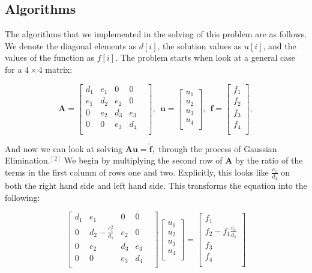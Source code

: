 \documentclass{article}
\begin{document}
\subsection{Algorithms}
The algorithms that we implemented in the solving of this problem are as follows. We denote the diagonal elements as $d[i]$, the solution values as $u[i]$, and the values of the function as $f[i]$. The problem starts when look at a general case for a $4\times 4$ matrix:

\[
\mathbf{A} = \begin{bmatrix}
d_{1}& e_{1}& 0& 0& \\
e_{1}& d_{2}& e_{2}& 0& \\
0& e_{2}& d_{3}& e_{3}& \\
0& 0& e_{3}& d_{4}& \\
\end{bmatrix},
\
\
\mathbf{u} = \begin{bmatrix}
u_{1}\\
u_{2} \\
u_{3}\\
u_{4}\\
\end{bmatrix},
\
\
\mathbf{f} = \begin{bmatrix}
f_{1}\\
f_{2} \\
f_{3}\\
f_{4}\\
\end{bmatrix},
\]

And now we can look at solving $\mathbf{A}\mathbf{u} = \tilde{\mathbf{f}},$ through the process of Gaussian Elimination.$^{[2]}$ We begin by multiplying the second row of $\mathbf{A}$ by the ratio of the terms in the first column of rows one and two. Explicitly, this looks like $\frac{e_{1}}{d_{1}}$ on both the right hand side and left hand side. This transforms the equation into the following: 

\[
\begin{bmatrix}
d_{1}& e_{1}& 0& 0& \\
0& d_{2}-\frac{e_{1}^{2}}{d_{1}}& e_{2}& 0& \\
0& e_{2}& d_{3}& e_{3}& \\
0& 0& e_{3}& d_{4}& \\
\end{bmatrix}
\begin{bmatrix}
u_{1}\\
u_{2} \\
u_{3}\\
u_{4}\\
\end{bmatrix}
=
\begin{bmatrix}
f_{1}\\
f_{2} - f_{1} \frac{e_{1}}{d_{1}} \\
f_{3}\\
f_{4}\\
\end{bmatrix}
\]
\end{document}
